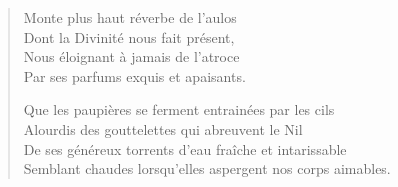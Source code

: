 \begin{verse}
  Monte plus haut réverbe de l’aulos\\  %
  Dont la Divinité nous fait présent,\\  %
  Nous éloignant à jamais de l’atroce\\  %
  Par ses parfums exquis et apaisants.

  Que les paupières se ferment entrainées par les cils\\  %
  Alourdis des gouttelettes qui abreuvent le Nil\\  %
  De ses généreux torrents d’eau fraîche et intarissable\\  %
  Semblant chaudes lorsqu’elles aspergent nos corps aimables.
\end{verse}


\newpage
\thispagestyle{empty}
\null\cleardoublepage
